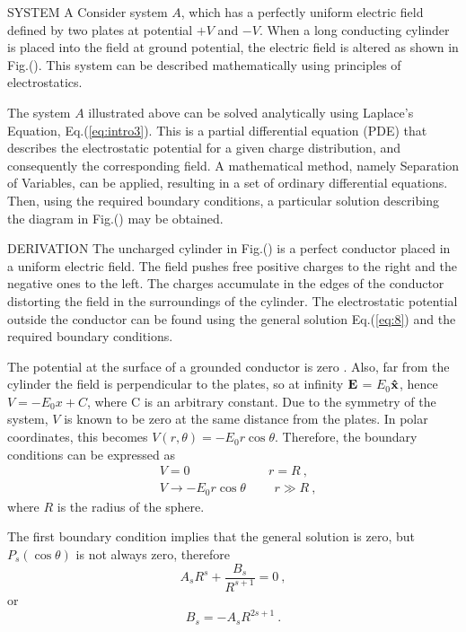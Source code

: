 \documentclass[a4paper]{jpconf}
\begin{document}
SYSTEM A
Consider system $A$, which has a perfectly uniform electric field defined by two plates at potential $+V$ and $-V$. When a long conducting cylinder is placed into the field at ground potential, the electric field is altered as shown in Fig.(). This system can be described mathematically using principles of electrostatics.

The system $A$ illustrated above can be solved analytically using Laplace's Equation, Eq.(\ref{eq:intro3}). This is a partial differential equation (PDE) that describes the electrostatic potential for a given charge distribution, and consequently the corresponding field. A mathematical method, namely Separation of Variables, can be applied, resulting in a set of ordinary differential equations. Then, using the required boundary conditions, a particular solution describing the diagram in Fig.() may be obtained. \\ \par 

DERIVATION
The uncharged cylinder in Fig.() is a perfect conductor placed in a uniform electric field. The field pushes free positive charges to the right and the negative ones to the left. The charges accumulate in the edges of the conductor distorting the field in the surroundings of the cylinder. The electrostatic potential outside the conductor can be found using the general solution Eq.(\ref{eq:8}) and the required boundary conditions.  \par
The potential at the surface of a grounded conductor is zero \cite{griffiths-introElec}. Also, far from the cylinder the field is perpendicular to the plates, so at infinity $\bf{E}$ = $E_0$$\bf{\hat{x}}$, hence $V = -E_0 x + C$, where C is an arbitrary constant. Due to the symmetry of the system, $V$ is known to be zero at the same distance from the plates. In polar coordinates, this becomes $V(r,\theta) = -E_0 r \cos \theta$. Therefore, the boundary conditions can be expressed as
\begin{subequations}
\begin{align}
&V = 0  \hspace{75pt} r = R~,\\ 
&V \to -E_0 r \cos \theta \hspace{27pt} r \gg R~,
\end{align}
\end{subequations}where $R$ is the radius of the sphere. 

The first boundary condition implies that the general solution is zero, but $P_s(\cos \theta)$ is not always zero, therefore
\begin{equation}
A_s R^s + \frac{B_s}{R^{s+1}} = 0~,
\end{equation}
or
\begin{equation}
B_s = -A_s R^{2s+1}~.
\end{equation}
\end{document}
